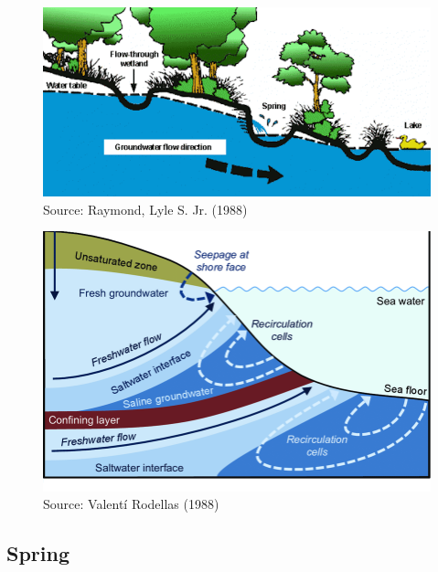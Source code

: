 \documentclass[
  letterpaper,
  DIV=11,
  numbers=noendperiod]{scrreprt}
\begin{document}
\begin{figure}

{\centering \includegraphics{archive/figures/groundwater-discharge.png}

}

\caption{Source: Raymond, Lyle S. Jr. (1988)}

\end{figure}

\begin{figure}

{\centering \includegraphics{archive/figures/groundwater-discharge-submarine.png}

}

\caption{Source: Valentí Rodellas (1988)}

\end{figure}

\hypertarget{spring}{%
\subsection{Spring}\label{spring}}
\end{document}

